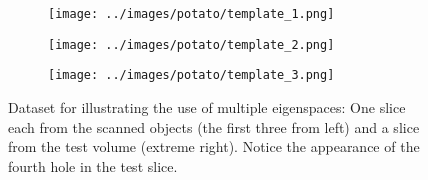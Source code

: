 \documentclass[journal]{IEEEtran}
\begin{document}
\begin{figure}[!h]
    \begin{subfigure}[b]{0.24\linewidth}
        \texttt{[image: ../images/potato/template\_1.png]}
\captionsetup{labelformat=empty}       
 \caption{}
    \end{subfigure}
    \begin{subfigure}[b]{0.24\linewidth}
        \texttt{[image: ../images/potato/template\_2.png]}
\captionsetup{labelformat=empty}
        \caption{}
     \end{subfigure}
    \begin{subfigure}[b]{0.24\linewidth}
        \texttt{[image: ../images/potato/template\_3.png]}
\captionsetup{labelformat=empty}
        \caption{}
     \end{subfigure}
    \begin{subfigure}[b]{0.235\linewidth}
\captionsetup{labelformat=empty}
        \caption{}
\label{fig:potato_test}
     \end{subfigure}
      \caption{Dataset for illustrating the use of multiple eigenspaces: One slice each from the scanned objects (the first three from left) and a slice from the test volume (extreme right). Notice the appearance of the fourth hole in the test slice. }
\label{fig:potato_data_2D}
\end{figure}
\end{document}

